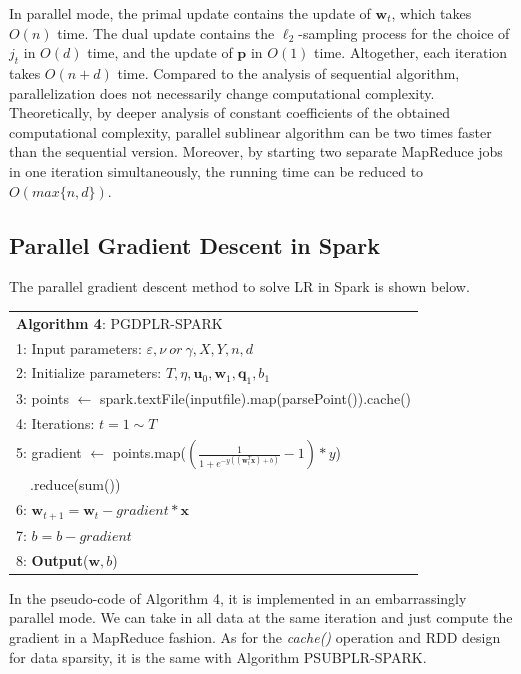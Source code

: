 \documentclass[10pt, conference, compsocconf]{IEEEtran}
\newcommand{\bw}{\mathbf{w}}
\newcommand{\bp}{\mathbf{p}}
\newcommand{\bq}{\mathbf{q}}
\newcommand{\tspace}{\hspace*{2em}}
\begin{document}
In parallel mode, the primal update contains the update of $\bw_t$, which takes $O(n)$ time.
The dual update contains the $\ell_2$-sampling process for the choice of $j_t$ in $O(d)$ time, and the update of $\bp$ in $O(1)$ time.
Altogether, each iteration takes $O(n+d)$ time.
Compared to the analysis of sequential algorithm, parallelization does not necessarily change computational complexity.
Theoretically, by deeper analysis of constant coefficients of the obtained computational complexity, parallel sublinear algorithm can be two times faster than the sequential version.
Moreover, by starting two separate MapReduce jobs in one iteration simultaneously, the running time can be reduced to $O(max\{n,d\})$.

\subsection{Parallel Gradient Descent in Spark}
The parallel gradient descent method to solve LR in Spark is shown below.
    \begin{table}[ht]
	\begin{tabular}{l}
    \hline\noalign{\smallskip}
	\textbf{Algorithm 4}: PGDPLR-SPARK \\
	\noalign{\smallskip}
	\hline
	\noalign{\smallskip}
    1:  Input parameters: $\varepsilon, \nu~or~\gamma, X, Y, n, d$ \\
    2:	Initialize parameters: $T, \eta, {\mathbf{u}}_{0}, {\bw}_{1}, {\mathbf{\bq}}_{1}, {b}_{1}$\\
    3:  points $\leftarrow$ spark.textFile(inputfile).map(parsePoint()).cache() \\
    4:  Iterations: $t=1 \sim T$ \\
    5:  \tspace gradient $\leftarrow$ points.map($(\frac{1}{1+e^{-y((\bw_t^T \textbf{x})+b)}}-1)*y$) \\
        ~~\tspace\tspace\tspace\tspace\tspace .reduce(sum()) \\
    6:  \tspace $\bw_{t+1} = \bw_t - gradient * \textbf{x}$ \\
    7:  \tspace $b = b - gradient$ \\
    8:  \textbf{Output}($\bw, b$) \\
    \hline
    \end{tabular}
	\end{table}

In the pseudo-code of Algorithm 4, it is implemented in an embarrassingly parallel mode.
We can take in all data at the same iteration and just compute the gradient in a MapReduce fashion.
As for the \textit{cache()} operation and RDD design for data sparsity, it is the same with Algorithm PSUBPLR-SPARK.
\end{document}
